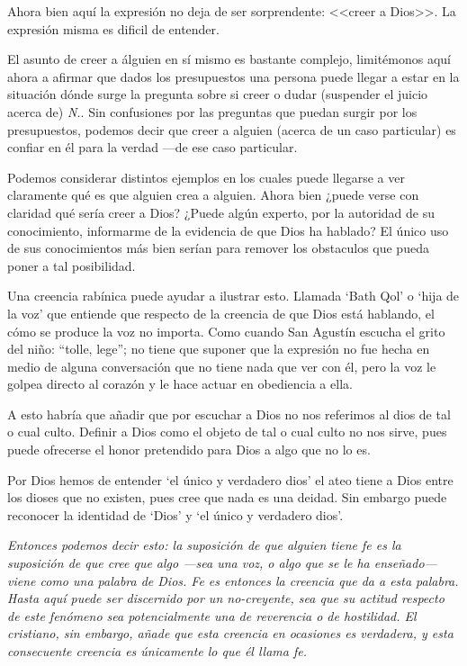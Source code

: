 \documentclass[10pt]{article}
\begin{document}
Ahora bien aquí la expresión no deja de ser sorprendente: <<creer a Dios>>. La
expresión misma es dificil de entender. 

El asunto de creer a álguien en sí mismo es bastante complejo, limitémonos aquí
ahora a afirmar que dados los presupuestos una persona puede llegar a estar en
la situación dónde surge la pregunta sobre si creer o dudar (suspender el juicio
acerca de) \emph{N.}. Sin confusiones por las preguntas que puedan surgir por
los presupuestos, podemos decir que creer a alguien (acerca de un caso
particular) es confiar en él para la verdad ---de ese caso particular.

Podemos considerar distintos ejemplos en los cuales puede llegarse a ver
claramente qué es que alguien crea a alguien. Ahora bien ¿puede verse con
claridad qué sería creer a Dios? ¿Puede algún experto, por la autoridad de su
conocimiento, informarme de la evidencia de que Dios ha hablado? El único uso de
sus conocimientos más bien serían para remover los obstaculos que pueda poner a
tal posibilidad.

Una creencia rabínica puede ayudar a ilustrar esto. Llamada `Bath Qol' o `hija
de la voz' que entiende que respecto de la creencia de que Dios está hablando, el
cómo se produce la voz no importa. Como cuando San Agustín escucha el grito del
niño: ``tolle, lege''; no tiene que suponer que la expresión no fue hecha en
medio de alguna conversación que no tiene nada que ver con él, pero la voz le
golpea directo al corazón y le hace actuar en obediencia a ella.

A esto habría que añadir que por escuchar a Dios no nos referimos al dios de
tal o cual culto. Definir a Dios como el objeto de tal o cual culto no nos
sirve, pues puede ofrecerse el honor pretendido para Dios a algo que no lo es.

Por Dios hemos de entender `el único y verdadero dios' el ateo tiene a Dios
entre los dioses que no existen, pues cree que nada es una deidad. Sin
embargo puede reconocer la identidad de `Dios' y `el único y verdadero
dios'.

\emph{Entonces podemos decir esto: la suposición de que alguien tiene fe
  es la suposición de que cree que algo ---sea una voz, o algo que se le ha
  enseñado--- viene como una palabra de Dios. Fe es entonces la creencia que da
  a esta palabra.\\Hasta aquí puede ser discernido por un no-creyente, sea que
  su actitud respecto de este fenómeno sea potencialmente una de reverencia o de
  hostilidad. El cristiano, sin embargo, añade que esta creencia en ocasiones es
  verdadera, y esta consecuente creencia es únicamente lo que \emph{él} llama
  fe.}
\end{document}
